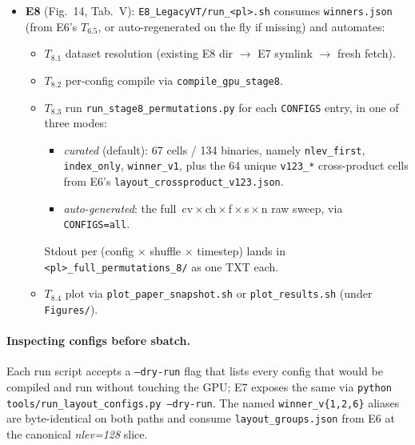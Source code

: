 \documentclass[conference]{IEEEtran}
\begin{document}
\begin{itemize}
\begin{itemize}
  \item $T_{6.5}$ winners cross-product (\texttt{generate\_winners.py} / \texttt{derive\_winners.py} / \texttt{generate\_layout\_groups.py}) $\to$ \texttt{winners.json}, \texttt{layout\_groups.json}.
  \item $T_{6.6}$ \texttt{plot\_paper.py} $\to$ Figs.~12--13, Tab.~IV.
  \end{itemize}
\item \textbf{E8} (Fig.~14, Tab.~V): \texttt{E8\_LegacyVT/run\_<pl>.sh} consumes \texttt{winners.json} (from E6's $T_{6.5}$, or auto-regenerated on the fly if missing) and automates:
  \begin{itemize}\itemsep1pt
  \item $T_{8.1}$ dataset resolution (existing E8 dir $\to$ E7 symlink $\to$ fresh fetch).
  \item $T_{8.2}$ per-config compile via \texttt{compile\_gpu\_stage8}.
  \item $T_{8.3}$ run \texttt{run\_stage8\_permutations.py} for each \texttt{CONFIGS} entry, in one of three modes:
    \begin{itemize}\setlength{\itemsep}{0pt}\setlength{\parsep}{0pt}
    \item \emph{curated} (default): 67 cells / 134 binaries, namely \texttt{nlev\_first}, \texttt{index\_only}, \texttt{winner\_v1}, plus the 64 unique \texttt{v123\_*} cross-product cells from E6's \texttt{layout\_crossproduct\_v123.json}.
    \item \emph{auto-generated}: the full $\,$cv\,$\times$\,ch\,$\times$\,f\,$\times$\,s\,$\times$\,n raw sweep, via \texttt{CONFIGS=all}.
    \end{itemize}
    Stdout per (config $\times$ shuffle $\times$ timestep) lands in \texttt{<pl>\_full\_permutations\_8/} as one TXT each.
  \item $T_{8.4}$ plot via \texttt{plot\_paper\_snapshot.sh} or \texttt{plot\_results.sh} (under \texttt{Figures/}).
  \end{itemize}
\end{itemize}

\paragraph{Inspecting configs before sbatch.} Each run script accepts a \texttt{--dry-run} flag that lists every config that would be compiled and run without touching the GPU; E7 exposes the same via \texttt{python tools/run\_layout\_configs.py --dry-run}. The named \texttt{winner\_v\{1,2,6\}} aliases are byte-identical on both paths and consume \texttt{layout\_groups.json} from E6 at the canonical \emph{nlev=128} slice.
\end{document}
